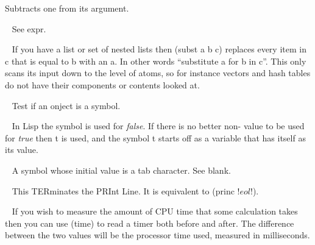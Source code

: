 \begin{description}
Subtracts one from its argument.
\item[{\tx subr~~~~~~~~~} \hspace{1cm} {\em symbol}]~\newline
See {\tx expr}.
\item[{\tx subst~~~~~~~~} \hspace{1cm} {\em function 3 args}]~\newline
If you have a list or set of nested lists then {\tx (subst a b c)} replaces every
item in {\tx c} that is equal to {\tx b} with an {\tx a}. In other
words ``substitute a for b in c''. This only scans its input down to the
level of atoms, so for instance vectors and hash tables do not have their
components or contents looked at.
\item[{\tx symbolp~~~~~~} \hspace{1cm} {\em function 1 arg}]~\newline
Test if an onject is a symbol.
\item[{\tx t~~~~~~~~~~~~} \hspace{1cm} {\em predefined variable}]~\newline
In Lisp the symbol \nil{} is used for {\em false}. If there is no better
non-\nil{} value to be used for {\em true} then {\tx t} is used, and the
symbol {\tx t} starts off as a variable that has itself as its value.
\item[{\tx tab~~~~~~~~~~} \hspace{1cm} {\em predefined variable}]~\newline
A symbol whose initial value is a tab character. See {\tx blank}.
\item[{\tx terpri~~~~~~~} \hspace{1cm} {\em function 0 args}]~\newline
This TERminates the PRInt Line. It is equivalent to {\tx (princ !$eol!$)}.
\item[{\tx time~~~~~~~~~} \hspace{1cm} {\em function 0 args}]~\newline
If you wish to measure the amount of CPU time that some calculation takes then
you can use {\tx (time)} to read a timer both before and after. The difference
between the two values will be the processor time used, measured in
milliseconds.
\item[{\tx times~~~~~~~~} \hspace{1cm} {\em special form}]~\newline

\end{description}
